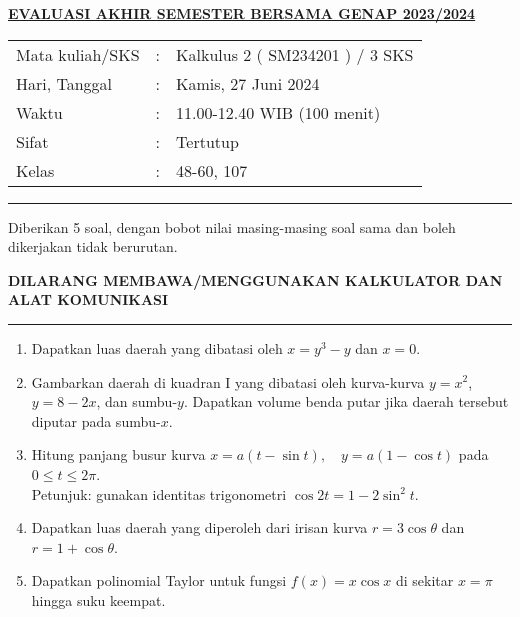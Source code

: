 \documentclass[11pt,openany,a4paper]{article}
\begin{document}
    \newpage

    \pagestyle{problems}

    \begin{center}
	{\underline{\textbf{\MakeUppercase{Evaluasi Akhir Semester Bersama Genap 2023/2024}}}}
    \end{center}

    \begin{center}
	\begin{tabular}{lcl}
		Mata kuliah/SKS & : & Kalkulus 2 ( SM234201 ) / 3 SKS\\
		Hari, Tanggal & : & Kamis, 27 Juni 2024\\
		Waktu & : & 11.00-12.40 WIB (100 menit)\\
		Sifat & : & Tertutup\\
		Kelas & : & 48-60, 107
	\end{tabular}
    \end{center}
	
    \noindent\rule{\textwidth}{2.pt}
	
    \setlength{\parindent}{5pt}
    \par Diberikan 5 soal, dengan bobot nilai masing-masing soal sama dan boleh dikerjakan tidak berurutan.
    \setlength{\parindent}{5pt}
    \setlength{\parindent}{5pt}
    {\small
    \par \textbf{\MakeUppercase{Dilarang membawa/menggunakan kalkulator dan alat komunikasi}}
    }
    \par {}
	
    \noindent\rule{\textwidth}{2.pt}
	
\begin{enumerate}
    \item Dapatkan luas daerah yang dibatasi oleh \( x = y^3 - y \) dan \( x = 0 \).

    \item Gambarkan daerah di kuadran I yang dibatasi oleh kurva-kurva \( y = x^2 \), \( y = 8 - 2x \), dan sumbu-\( y \). 
    Dapatkan volume benda putar jika daerah tersebut diputar pada sumbu-\( x \).

    \item Hitung panjang busur kurva 
    $
        x = a(t - \sin t), \quad y = a(1 - \cos t)
    $
    pada \( 0 \leq t \leq 2\pi \).\\
    Petunjuk: gunakan identitas trigonometri \( \cos 2t = 1 - 2\sin^2 t \).

    \item Dapatkan luas daerah yang diperoleh dari irisan kurva \( r = 3\cos \theta \) dan \( r = 1 + \cos \theta \).

    \item Dapatkan polinomial Taylor untuk fungsi \( f(x) = x \cos x \) di sekitar \( x = \pi \) hingga suku keempat.
\end{enumerate}
	
\end{document}
